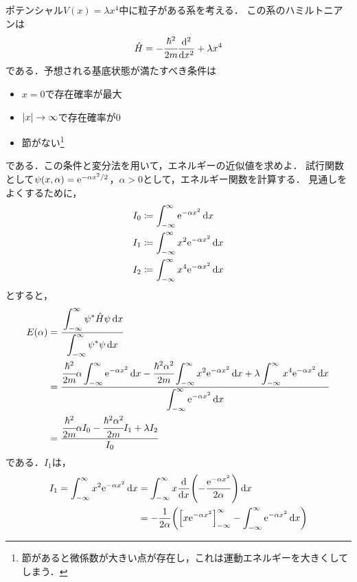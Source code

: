 \documentclass{report}
\begin{document}
  \begin{myex}{}{}
    ポテンシャル$V(x)=\lambda x^4$中に粒子がある系を考える．
    この系のハミルトニアンは
    \begin{align}
      \hat{H} = -\cfrac{\hbar^2}{2m}\dv[2]{x} + \lambda x^4
    \end{align}
    である．予想される基底状態が満たすべき条件は
    \begin{itemize}
      \item $x = 0$で存在確率が最大
      \item $\abs{x} \to \infty$で存在確率が0
      \item 節がない\footnote{節があると微係数が大きい点が存在し，これは運動エネルギーを大きくしてしまう．}
    \end{itemize}
    である．この条件と変分法を用いて，エネルギーの近似値を求めよ．
    \tcblower
    試行関数として$\psi(x, \alpha) = \mathrm{e}^{-\alpha x^2/2}$，$\alpha > 0$として，エネルギー関数を計算する．
    見通しをよくするために，
    \begin{align}
      I_0 &\coloneqq \int_{-\infty}^{\infty}\mathrm{e}^{-\alpha x^2} \dd{x} \\ 
      I_1 &\coloneqq \int_{-\infty}^{\infty}x^2\mathrm{e}^{-\alpha x^2} \dd{x} \\ 
      I_2 &\coloneqq \int_{-\infty}^{\infty}x^4\mathrm{e}^{-\alpha x^2} \dd{x} 
    \end{align}
    とすると，
    \begin{align}
      E(\alpha) &= \cfrac{\displaystyle\int_{-\infty}^{\infty} \psi^{*}\hat{H}\psi \dd{x}}{\displaystyle\int_{-\infty}^{\infty} \psi^{*}\psi \dd{x}} \\ 
      &= \frac{\displaystyle \cfrac{\hbar^2}{2m}\alpha\int_{-\infty}^{\infty}\mathrm{e}^{-\alpha x^2}\dd{x} -\cfrac{\hbar^2\alpha^2}{2m}\int_{-\infty}^{\infty}x^2\mathrm{e}^{-\alpha x^2} \dd{x} + \lambda\int_{-\infty}^{\infty}x^4\mathrm{e}^{-\alpha x^2}\dd{x}}{\displaystyle\int_{-\infty}^{\infty}\mathrm{e}^{-\alpha x^2}\dd{x}} \\
      &= \frac{\cfrac{\hbar^2}{2m}\alpha I_0 - \cfrac{\hbar^2\alpha^2}{2m}I_1 + \lambda I_2}{I_0}\label{E1}
    \end{align}
    である．$I_1$は，
    \begin{align}
      I_1 = \int_{-\infty}^{\infty}x^2\e^{-\alpha x^2}\dd{x} &= \int_{-\infty}^{\infty}x\dv{x}\qty(-\frac{\e^{-\alpha x^2}}{2\alpha}) \dd{x} \\ 
      &= -\frac{1}{2\alpha}\qty(\qty[x\e^{-\alpha x^2}]_{-\infty}^{\infty} - \int_{-\infty}^{\infty}\e^{-\alpha x^2}\dd{x}) \\ 

\end{align}
\end{myex}
\end{document}
